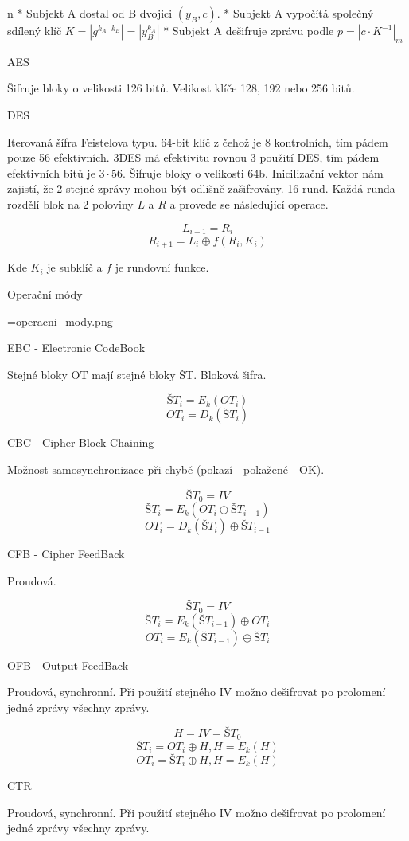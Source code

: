 \begitems \style n
* Subjekt A dostal od B dvojici $\left(y_B, c\right)$.
* Subjekt A vypočítá společný sdílený klíč $K = \left|g^{k_A \cdot k_B}\right| = \left|y_B^{k_A}\right|$
* Subjekt A dešifruje zprávu podle $p = \left|c \cdot K^{-1}\right|_m$
\enditems

\sec AES

Šifruje bloky o velikosti 126 bitů. Velikost klíče 128, 192 nebo 256 bitů.

\sec DES

Iterovaná šífra Feistelova typu.
64-bit klíč z čehož je 8 kontrolních, tím pádem pouze 56 efektivních. 3DES má efektivitu rovnou 3 použití DES, tím pádem efektivních bitů je $3 \cdot 56$. 
Šifruje bloky o velikosti 64b.
Inicilizační vektor nám zajistí, že 2 stejné zprávy mohou být odlišně zašifrovány.
16 rund. Každá runda rozdělí blok na 2 poloviny $L$ a $R$ a provede se následující operace.

$$L_{i+1} = R_i$$
$$R_{i+1} = L_i \oplus f(R_i, K_i)$$

Kde $K_i$ je subklíč a $f$ je rundovní funkce.

\sec Operační módy

\centerline {\picwidth=\hsize \inspic operacni_mody.png }

\secc EBC - Electronic CodeBook

Stejné bloky OT mají stejné bloky ŠT. Bloková šifra.

$$ŠT_i = E_k\left(OT_i\right)$$
$$OT_i = D_k\left(ŠT_i\right)$$

\secc CBC - Cipher Block Chaining

Možnost samosynchronizace při chybě (pokazí - pokažené - OK). 

$$ŠT_0 = IV$$
$$ŠT_i = E_k\left(OT_i \oplus ŠT_{i-1} \right)$$
$$OT_i = D_k\left(ŠT_{i} \right) \oplus ŠT_{i-1}$$

\secc CFB - Cipher FeedBack

Proudová.

$$ŠT_0 = IV$$
$$ŠT_i = E_k\left(ŠT_{i-1} \right) \oplus OT_i$$
$$OT_i = E_k\left(ŠT_{i-1} \right) \oplus ŠT_i$$

\secc OFB - Output FeedBack

Proudová, synchronní. Při použití stejného IV možno dešifrovat po prolomení jedné zprávy všechny zprávy.

$$H = IV = ŠT_0$$
$$ŠT_i = OT_i \oplus H, H = E_k\left(H\right)$$
$$OT_i = ŠT_i \oplus H, H = E_k\left(H\right)$$

\secc CTR

Proudová, synchronní. Při použití stejného IV možno dešifrovat po prolomení jedné zprávy všechny zprávy.


